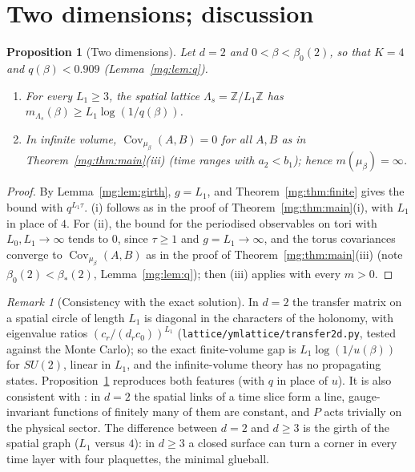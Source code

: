 \documentclass[11pt,a4paper]{article}
\newtheorem{proposition}[theorem]{Proposition}
\theoremstyle{definition}
\theoremstyle{remark}
\newtheorem{remark}[theorem]{Remark}
\DeclareMathOperator{\Cov}{Cov}
\newcommand{\Z}{\mathbb{Z}}
\newcommand{\IIref}[3]{\cite[#1~`#2' (\texttt{#3})]{II}}
\newcommand{\IIlab}[2]{\cite[#1 \texttt{#2}]{II}}
\begin{document}
\section{Two dimensions; discussion}\label{mg:sec:discussion}

\begin{proposition}[Two dimensions]\label{mg:prop:2d}
Let $d=2$ and $0<\beta<\beta_0(2)$, so that $K=4$ and $q(\beta)<0.909$ (Lemma~\ref{mg:lem:q}).
\begin{enumerate}[label=(\roman*)]
\item For every $L_1\ge3$, the spatial lattice $\Lambda_s=\Z/L_1\Z$ has $m_{\Lambda_s}(\beta)\ge L_1\log(1/q(\beta))$.
\item In infinite volume, $\Cov_{\mu_\beta}(A,B)=0$ for all $A,B$ as in Theorem~\ref{mg:thm:main}(iii) (time ranges with $a_2<b_1$);
hence $m(\mu_\beta)=\infty$.
\end{enumerate}
\end{proposition}

\begin{proof}
By Lemma~\ref{mg:lem:girth}, $g=L_1$, and Theorem~\ref{mg:thm:finite} gives the bound with $q^{L_1\tau}$. (i) follows as in the proof of
Theorem~\ref{mg:thm:main}(i), with $L_1$ in place of $4$. For (ii), the bound for the periodised observables on tori with $L_0,L_1\to\infty$
tends to $0$, since $\tau\ge1$ and $g=L_1\to\infty$, and the torus covariances converge to $\Cov_{\mu_\beta}(A,B)$ as in the proof of
Theorem~\ref{mg:thm:main}(iii) (note $\beta_0(2)<\beta_*(2)$, Lemma~\ref{mg:lem:q}); then \IIlab{Theorem}{iv:thm:OS}(iii) applies with every
$m>0$.
\end{proof}

\begin{remark}[Consistency with the exact solution]
In $d=2$ the transfer matrix on a spatial circle of length $L_1$ is diagonal in the characters of the holonomy, with eigenvalue ratios
$(c_r/(d_rc_0))^{L_1}$ (\texttt{lattice/ymlattice/transfer2d.py}, tested against the Monte Carlo); so the exact finite-volume gap is
$L_1\log(1/u(\beta))$ for $SU(2)$, linear in $L_1$, and the infinite-volume theory has no propagating states. Proposition~\ref{mg:prop:2d}
reproduces both features (with $q$ in place of $u$). It is also consistent with \IIref{Proposition}{Gauge invariance of the ground-state
chain}{iv:prop:phys}: in $d=2$ the spatial links of a time slice form a line, gauge-invariant functions of finitely many of them are constant,
and $P$ acts trivially on the physical sector. The difference between $d=2$ and $d\ge3$ is the girth of the spatial graph ($L_1$ versus
$4$): in $d\ge3$ a closed surface can turn a corner in every time layer with four plaquettes, the minimal glueball.
\end{remark}
\end{document}
